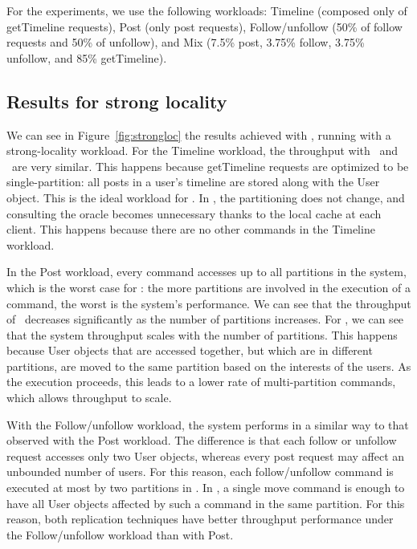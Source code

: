 For the experiments, we use the following workloads:
Timeline (composed only of getTimeline requests),
Post (only post requests),
Follow/unfollow (50\% of follow requests and 50\% of unfollow), and
Mix (7.5\% post, 3.75\% follow, 3.75\% unfollow, and 85\% getTimeline).

\subsection{Results for strong locality}
\label{sec:evaluation:strongloc}


We can see in Figure~\ref{fig:strongloc} the results achieved with \appname{}, running with a strong-locality workload.
For the Timeline workload, the throughput with \dssmr\ and \ssmr\ are very similar.
This happens because getTimeline requests are optimized to be single-partition:
all posts in a user's timeline are stored along with the User object.
This is the ideal workload for \ssmr{}.
In \dssmr{}, the partitioning does not change, and consulting the oracle becomes unnecessary thanks to the local cache at each client.
This happens because there are no other commands in the Timeline workload.

In the Post workload, every command accesses up to all partitions in the system, which is the worst case for \ssmr{}: the more partitions are involved in the execution of a command, the worst is the system's performance.
We can see that the throughput of \ssmr\ decreases significantly as the number of partitions increases.
For \dssmr{}, we can see that the system throughput scales with the number of partitions.
This happens because User objects that are accessed together, but which are in different partitions, are moved to the same partition based on the interests of the users.
As the execution proceeds, this leads to a lower rate of multi-partition commands, which allows throughput to scale.

With the Follow/unfollow workload, the system performs in a similar way to that observed with the Post workload.
The difference is that each follow or unfollow request accesses only two User objects, whereas every post request may affect an unbounded number of users.
For this reason, each follow/unfollow command is executed at most by two partitions in \ssmr{}.
In \dssmr{}, a single move command is enough to have all User objects affected by such a command in the same partition.
For this reason, both replication techniques have better throughput performance under the Follow/unfollow workload than with Post.

